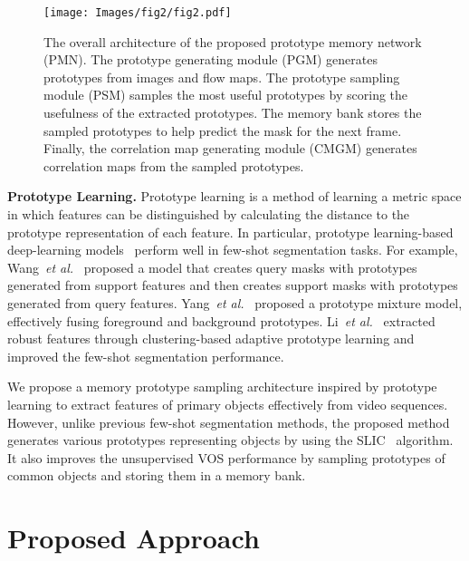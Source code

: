 \documentclass[10pt,twocolumn,letterpaper]{article}
\begin{document}
\begin{figure*}[t]
	\setlength{\belowcaptionskip}{-24pt}
	\begin{center}
		\texttt{[image: Images/fig2/fig2.pdf]}
		\caption{The overall architecture of the proposed prototype memory network (PMN). The prototype generating module (PGM) generates prototypes from images and flow maps. The prototype sampling module (PSM) samples the most useful prototypes by scoring the usefulness of the extracted prototypes. The memory bank stores the sampled prototypes to help predict the mask for the next frame. Finally, the correlation map generating module (CMGM) generates correlation maps from the sampled prototypes.}
		\label{fig:main}
	\end{center}
\end{figure*}

\noindent
\textbf{Prototype Learning.} Prototype learning is a method of learning a metric space in which features can be distinguished by calculating the distance to the prototype representation of each feature. In particular, prototype learning-based deep-learning models~\cite{dong2018few, wang2019panet, liu2020part, yang2020prototype, yu2021location, li2021adaptive} perform well in few-shot segmentation tasks. For example, Wang~\textit{et al.}~\cite{wang2019panet} proposed a model that creates query masks with prototypes generated from support features and then creates support masks with prototypes generated from query features. Yang~\textit{et al.}~\cite{yang2020prototype} proposed a prototype mixture model, effectively fusing foreground and background prototypes. Li~\textit{et al.}~\cite{li2021adaptive} extracted robust features through clustering-based adaptive prototype learning and improved the few-shot segmentation performance.

We propose a memory prototype sampling architecture inspired by prototype learning to extract features of primary objects effectively from video sequences. However, unlike previous few-shot segmentation methods, the proposed method generates various prototypes representing objects by using the SLIC~\cite{achanta2012slic} algorithm. It also improves the unsupervised VOS performance by sampling prototypes of common objects and storing them in a memory bank.



\section{Proposed Approach}
\end{document}
